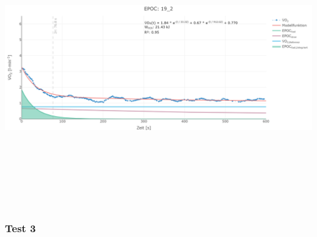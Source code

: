 \documentclass[
  letterpaper,
  DIV=11]{scrartcl}
\begin{document}
\includegraphics[width=11.45833in,height=4.6875in]{images/19_2.png}

\subsubsection{Test 3}
\end{document}
